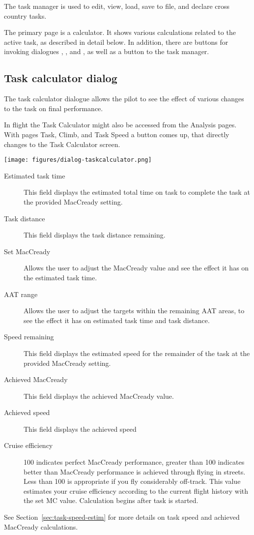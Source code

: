 The task manager is used to edit, view, load, save to file, and declare cross
country tasks.

The primary page is a calculator. It shows various calculations 
related to the active task, as described in detail below.  In addition, there 
are buttons for invoking dialogues , , 
and , as well as a button to  the task manager.

\subsection*{Task calculator dialog}\label{sec:task-calc-dial}
The task calculator dialogue allows the pilot to see the effect of
various changes to the task on final performance.

In flight the Task Calculator might also be accessed from the Analysis pages. 
With pages Task, Climb, and Task Speed a button  comes up,
that directly changes to the Task Calculator screen.


\begin{center}
\texttt{[image: figures/dialog-taskcalculator.png]}
\end{center}

\begin{description}
\item[Estimated task time]  This field displays the estimated total time 
  on task to complete the task at the provided MacCready setting.
\item[Task distance]  This field displays the task distance remaining.
\item[Set MacCready]  Allows the user to adjust the MacCready value and 
  see the effect it has on the estimated task time.
\item[AAT range]  Allows the user to adjust the targets within the remaining 
  AAT areas, to see the effect it has on estimated task time and task distance.
\item[Speed remaining]  This field displays the estimated speed for the
  remainder of the task at the provided MacCready setting.
\item[Achieved MacCready]  This field displays the achieved MacCready value.
\item[Achieved speed]  This field displays the achieved speed %
\item[Cruise efficiency]  100 indicates perfect MacCready performance, greater 
than 100 indicates better than MacCready performance is achieved through flying
in streets. Less than 100 is appropriate if you fly considerably off-track. This 
value estimates your cruise efficiency according to the current flight history 
with the set MC value. Calculation begins after task is started.
\end{description}
See Section~\ref{sec:task-speed-estim} for more details on task speed
and achieved MacCready calculations.

